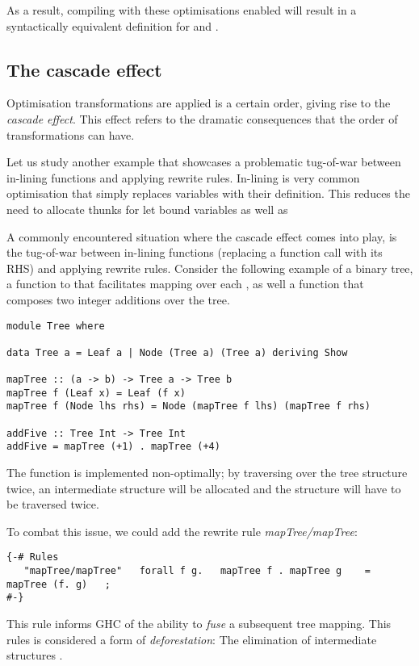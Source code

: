 As a result, compiling with these optimisations enabled will result in a syntactically equivalent
definition for  and .

\subsection{The cascade effect}

Optimisation transformations are applied is a certain order, giving rise to the \textit{cascade effect}. \cite{haskell_optimisations_1997}
This effect refers to the dramatic consequences that the order of transformations can have. 

Let us study another example that showcases a problematic tug-of-war between in-lining functions
and applying rewrite rules. In-lining is very common optimisation that simply replaces variables
with their definition. This reduces the need to allocate thunks for let bound variables as well as 

A commonly encountered situation where the cascade effect comes into play,
is the tug-of-war between in-lining functions (replacing a function call with its RHS) and applying rewrite rules. Consider
the following example of a binary tree,  a function to that facilitates mapping over each , as well a function
that composes two integer additions over the tree.

\begin{verbatim}
module Tree where

data Tree a = Leaf a | Node (Tree a) (Tree a) deriving Show

mapTree :: (a -> b) -> Tree a -> Tree b
mapTree f (Leaf x) = Leaf (f x)
mapTree f (Node lhs rhs) = Node (mapTree f lhs) (mapTree f rhs)

addFive :: Tree Int -> Tree Int
addFive = mapTree (+1) . mapTree (+4)
\end{verbatim}

The  function is implemented non-optimally; by traversing
over the tree structure twice, an intermediate structure will be allocated
and the structure will have to be traversed twice.

To combat this issue, we could add the rewrite rule \textit{mapTree/mapTree}:
\begin{verbatim}
{-# Rules
   "mapTree/mapTree"   forall f g.   mapTree f . mapTree g    = mapTree (f. g)   ;
#-}
\end{verbatim}

This rule informs GHC of the ability to \textit{fuse} a subsequent tree mapping.
This rules is considered a form of \textit{deforestation}: 
The elimination of intermediate structures \cite{WADLER1990231}.

